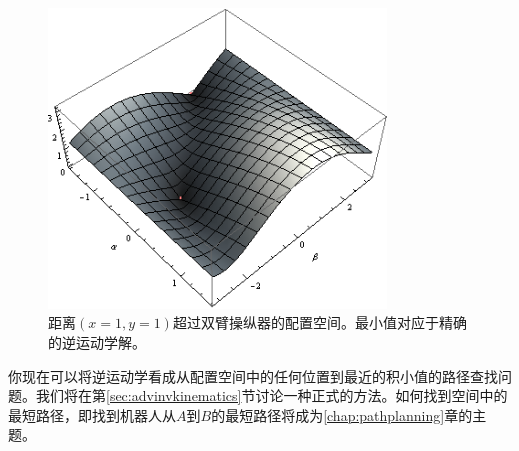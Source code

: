 \begin{figure}
	\centering
		\includegraphics[width=0.8\textwidth]{figs/inversekinematics}
	\caption{距离$(x = 1, y = 1)$超过双臂操纵器的配置空间。最小值对应于精确的逆运动学解。}
	\label{fig:inversekinematics}
\end{figure}


你现在可以将逆运动学看成从配置空间中的任何位置到最近的积小值的路径查找问题。我们将在第\ref{sec:advinvkinematics}节讨论一种正式的方法。如何找到空间中的最短路径，即找到机器人从$A$到$B$的最短路径将成为\ref{chap:pathplanning}章的主题。


